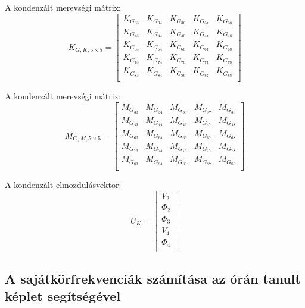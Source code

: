 \documentclass{article}
\begin{document}
			A kondenzált merevségi mátrix: 
			\begin{equation}
				K_{G,K,5\times5}=
				\begin{bmatrix}
				K_{G_{33}}	 & K_{G_{34}}	 & K_{G_{36}} & K_{G_{37}}	 & K_{G_{38}}  \\
				K_{G_{43}}	 & K_{G_{44}}	 & K_{G_{46}} & K_{G_{47}}	 & K_{G_{48}}  \\
				K_{G_{63}}	 & K_{G_{64}}	 & K_{G_{66}} & K_{G_{67}}	 & K_{G_{68}}  \\
				K_{G_{73}}	 & K_{G_{74}}	 & K_{G_{76}} & K_{G_{77}}	 & K_{G_{78}}  \\
				K_{G_{83}}	 & K_{G_{84}}	 & K_{G_{86}} & K_{G_{87}}	 & K_{G_{88}}  \\
				\end{bmatrix}
			\end{equation}
			
			A kondenzált merevségi mátrix: 
			\begin{equation}
				M_{G,M,5\times5}=
				\begin{bmatrix}
				M_{G_{33}}	 & M_{G_{34}}	 & M_{G_{36}} & M_{G_{37}}	 & M_{G_{38}}  \\
				M_{G_{43}}	 & M_{G_{44}}	 & M_{G_{46}} & M_{G_{47}}	 & M_{G_{48}}  \\
				M_{G_{63}}	 & M_{G_{64}}	 & M_{G_{66}} & M_{G_{67}}	 & M_{G_{68}}  \\
				M_{G_{73}}	 & M_{G_{74}}	 & M_{G_{76}} & M_{G_{77}}	 & M_{G_{78}}  \\
				M_{G_{83}}	 & M_{G_{84}}	 & M_{G_{86}} & M_{G_{87}}	 & M_{G_{88}}  \\
				\end{bmatrix}
			\end{equation}
			
			A kondenzált elmozdulásvektor:
			\begin{equation}
				U_K=
				\begin{bmatrix}
				V_{2}    \\
				\Phi_{2} \\
				\Phi_{3} \\
				V_{4}    \\
				\Phi_{4} \\
				\end{bmatrix}
			\end{equation} 
	
		\subsection{A sajátkörfrekvenciák számítása az órán tanult képlet segítségével}
	
\end{document}
